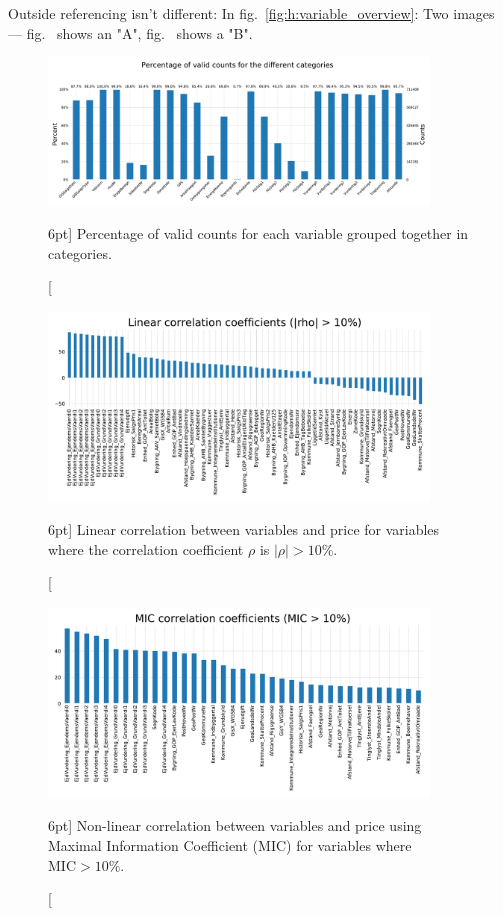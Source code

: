 \documentclass[a4paper, twoside, nobib]{tufte-book}
\begin{document}
Outside referencing isn't different: In fig.~\ref{fig:h:variable_overview}: Two images --- fig.~ shows an "A", fig.~ shows a "B".



\begin{figure}
  \includegraphics[width=0.9\textwidth, trim=0 0 0 40, clip]{figures/housing/missing_bar.pdf}
  \caption[Percentage of valid counts for each variable][6pt]
          {Percentage of valid counts for each variable grouped together in categories.}
  \label{fig:h:nans}
\end{figure}


\begin{figure}
  \includegraphics[width=0.9\textwidth, trim=0 0 0 40, clip]{figures/housing/lin_correlation.pdf}
  \caption[Linear correlation between variables and price][6pt]
          {Linear correlation between variables and price for variables where the correlation coefficient $\rho$ is $|\rho| > 10\%$.}
  \label{fig:h:corr_lin}
\end{figure}

\begin{figure}
  \includegraphics[width=0.9\textwidth, trim=0 0 0 40, clip]{figures/housing/MIC_plot.pdf}
  \caption[Non-linear correlation between variables and price][6pt]
          {Non-linear correlation between variables and price using Maximal Information Coefficient (MIC) for variables where $\text{MIC}>10\%$.}
  \label{fig:h:corr_MIC}
\end{figure}
\end{document}
